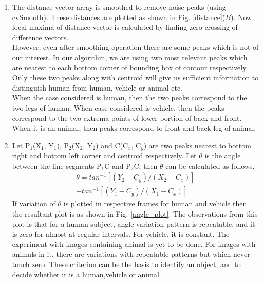 \documentclass[conference]{IEEEtran}
\begin{document}
\begin{enumerate}
\item The distance vector array is smoothed to remove noise peaks (using
cvSmooth). These distances are plotted  as shown in Fig.
\ref{distance}($B$). Now local maxima of distance vector is calculated
by finding zero crossing of difference vectors.\\
\indent However, even after smoothing operation there are some peaks which is
not of our interest.  In our algorithm, we are using two most relevant
peaks which are nearest to each bottom corner of bounding box of contour
respectively.  Only these two peaks along with centroid will give us
sufficient information to distinguish human from human, vehicle or
animal etc. \\
\indent When the case considered is human, then the two peaks correspond to
the two legs of human. When case considered is vehicle, then the peaks
correspond to the two extrema points of lower portion of back and front.
When it is an animal, then peaks correspond to front and back leg of
animal.\\
\item Let P$_1$(X$_1$, Y$_1$), P$_2$(X$_2$, Y$_2$) and C(C$_x$, C$_y$)
are two peaks nearest to bottom right and bottom left corner and
centroid respectively. Let $\theta$ is the angle between the line
segments P$_1$C and P$_2$C, then $\theta$ can be calculated as
follows.\\
%
	\begin{equation}
	\begin{split}
	\theta = tan^{-1}[(Y_2 - C_y) / (X_2 - C_x)] \\
	 - tan^{-1}[(Y_1 - C_y) / (X_1 - C_x)]
	\end{split}
	\end{equation}
%
\indent If variation of $\theta$ is plotted in respective frames for
human and vehicle then the resultant plot is as shown in Fig.
\ref{angle_plot}.  The observations from this plot is that for a  human
subject, angle variation pattern is repeatable, and it is zero for
almost at regular intervals.  For vehicle, it is constant. The
experiment with images containing animal is yet to be done. For images
with animals in it, there are variations with repeatable patterns but
which never touch zero.  These criterion can be the basis to identify an
object, and to decide whether it is a human,vehicle or animal.


\end{enumerate}
\end{document}
